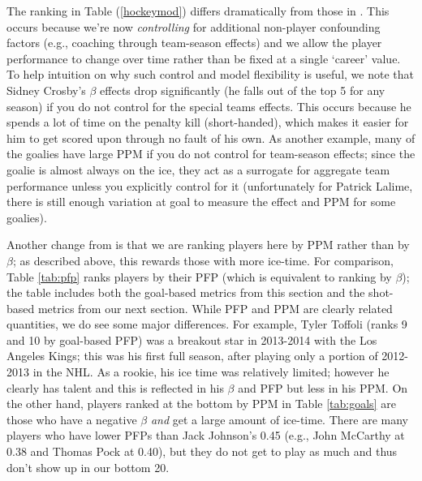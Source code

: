 The ranking in Table (\ref{hockeymod}) differs dramatically from those in
\cite{gramacy:jensen:taddy:2013}.  This occurs because we're now
\textit{controlling} for additional non-player confounding factors (e.g.,
coaching through team-season effects) and we allow the player performance to
change over time rather than be fixed at a single `career' value.   To help
intuition on why such control and model flexibility is useful, we note that
Sidney Crosby's $\beta$ effects drop significantly (he falls out of the top 5
for any season) if you do not control for the special teams effects.  This
occurs because he spends a lot of time on the penalty kill (short-handed),
which makes it easier for him to get scored upon through no fault of his own.
As another example, many of the goalies have large PPM if you do not control
for team-season effects; since the goalie is almost always on the ice, they
act as a surrogate for aggregate team performance unless you explicitly
control for it (unfortunately for Patrick Lalime, there is still enough
variation at goal to measure the effect and PPM for some goalies).

Another change from \cite{gramacy:jensen:taddy:2013} is that we are ranking
players here by PPM rather than by $\beta$; as described above, this rewards
those with more ice-time. For comparison, Table \ref{tab:pfp} ranks players by
their PFP (which is equivalent to ranking by $\beta$); the table includes both
the goal-based metrics from this section and the shot-based metrics from our
next section. While PFP and PPM are clearly related quantities, we do see some
major differences.  For example, Tyler Toffoli (ranks 9 and 10 by goal-based
PFP) was a breakout star in 2013-2014 with the Los Angeles Kings; this was his
first full season, after playing only a portion of 2012-2013 in the NHL.  As a
rookie, his ice time was relatively limited; however he clearly has talent and
this is reflected in his $\beta$  and PFP but less in his PPM.  On the
other hand, players ranked at the bottom by PPM in Table \ref{tab:goals} are those who have a negative
$\beta$ \textit{and} get a large amount of ice-time. There are many players who have
lower PFPs than Jack Johnson's 0.45 (e.g., John McCarthy at 0.38 and Thomas Pock
at 0.40), but they do not get to play as much and thus don't show up in our
bottom 20.


